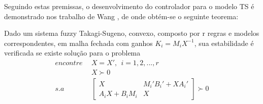 Seguindo estas premissas, o desenvolvimento do controlador para o modelo TS é demonstrado nos trabalho de Wang \cite{wang}, de onde obtém-se o seguinte teorema:
\begin{myteo} \label{teoControlador}
Dado um sistema fuzzy Takagi-Sugeno, convexo, composto por r regras e modelos correspondentes, em malha fechada com ganhos $K_i = M_i X^{-1}$, sua estabilidade é verificada se existe solução para o problema
	\begin{align} \label{eqContFuzzy}
		encontre \ \ &X = X', \ \ i = 1,2,...,r \nonumber \\
		&X \succ 0 \nonumber \\
		s.a \ \ & 
		\begin{bmatrix}
			X	&	M_i'B_i' + XA_i' \\
			A_iX + B_iM_i &	X
		\end{bmatrix} \succ 0 \nonumber \\
	\end{align}
\end{myteo}

%

